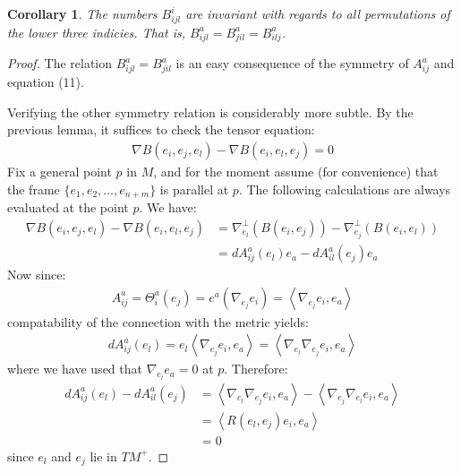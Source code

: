 \documentclass[11pt]{amsart}
\newtheorem{cor}[subsection]{Corollary}
\theoremstyle{definition}
\def \la { \left\langle }
\def \ra { \right\rangle }
\begin{document}
\begin{cor}  The numbers $B^i_{ijl}$ are invariant with regards to all permutations of the lower three indicies.  That is, $B^a_{ijl} = B^a_{jil} = B^a_{ilj}$. 
\end{cor}  
%
\begin{proof} The relation $B^a_{ijl} = B^a_{jil}$ is an easy consequence of the symmetry of $A^a_{ij}$ and equation (11). 

Verifying the other symmetry relation is considerably more subtle.  By the previous lemma, it suffices to check the tensor equation:
%
\begin{align*}
\nabla B (e_i, e_j, e_l) - \nabla B (e_i, e_l, e_j ) = 0
\end{align*}
%
Fix a general point $p$ in $M$, and for the moment assume (for convenience) that the frame $\{ e_1, e_2, \ldots, e_{n+m} \}$ is parallel at $p$.  The following calculations are always evaluated at the point $p$.  We have:
%
\begin{align*}
\nabla B (e_i, e_j, e_l) - \nabla B (e_i, e_l, e_j ) &= \nabla^{\perp}_{e_l}( B(e_i, e_j) ) - \nabla^{\perp}_{e_j}( B(e_i, e_l) )\\
&= d A^a_{ij} (e_l) e_a - d A^a_{il} (e_j) e_a
\end{align*}
%
Now since:
%
\begin{align*}
A^a_{ij} = \Theta^a_i (e_j) = e^a( \nabla_{e_j} e_i ) = \la \nabla_{e_j} e_i, e_a \ra
\end{align*}
%
compatability of the connection with the metric yields:
%
\begin{align*}
d A^a_{ij} (e_l) = e_l \la \nabla_{e_j} e_i, e_a \ra = \la \nabla_{e_l} \nabla_{e_j} e_i, e_a \ra
\end{align*}
%
where we have used that $\nabla_{e_l} e_{a} = 0$ at $p$.  Therefore:
%
\begin{align*}
d A^a_{ij} (e_l) - d A^a_{il} (e_j) &= \la \nabla_{e_l} \nabla_{e_j} e_i, e_a \ra - \la \nabla_{e_j} \nabla_{e_l} e_i, e_a \ra \\
&= \la R(e_l, e_j) e_i, e_a \ra \\
&= 0
\end{align*}
%
since $e_l$ and $e_j$ lie in $TM^{+}$.
%
\end{proof}
\end{document}
